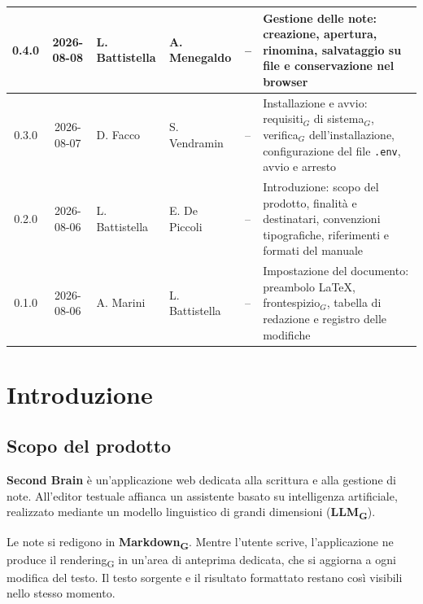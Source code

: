 \documentclass[a4paper, 10pt]{article}
\begin{document}
\begin{longtable}{|c|c|P{2.1cm}|P{2.1cm}|P{2.1cm}|P{3.1cm}|}
    0.4.0 & 2026-08-08 & L. Battistella & A. Menegaldo & -- & Gestione delle note: creazione, apertura, rinomina, salvataggio su file e conservazione nel browser \\ \hline

    0.3.0 & 2026-08-07 & D. Facco & S. Vendramin & -- & Installazione e avvio: requisiti$_G$ di sistema$_G$, verifica$_G$ dell'installazione, configurazione del file \texttt{.env}, avvio e arresto \\ \hline

    0.2.0 & 2026-08-06 & L. Battistella & E. De Piccoli & -- & Introduzione: scopo del prodotto, finalità e destinatari, convenzioni tipografiche, riferimenti e formati del manuale \\ \hline

    0.1.0 & 2026-08-06 & A. Marini & L. Battistella & -- & Impostazione del documento: preambolo \LaTeX{}, frontespizio$_G$, tabella di redazione e registro delle modifiche \\ \hline

\end{longtable}
\addtocounter{table}{-1}
\endgroup

\newpage
\tableofcontents
\newpage

\listoftables
\newpage

\listoffigures
\newpage


\section{Introduzione}
\label{sec:introduzione}

\subsection{Scopo del prodotto}
\label{sec:scopo-prodotto}
\textbf{Second Brain} è un'applicazione web dedicata alla scrittura e alla gestione di note. All'editor testuale affianca un assistente basato su intelligenza artificiale, realizzato mediante un modello linguistico di grandi dimensioni (\textbf{LLM\textsubscript{G}}).

Le note si redigono in \textbf{Markdown\textsubscript{G}}. Mentre l'utente scrive, l'applicazione ne produce il rendering\textsubscript{G} in un'area di anteprima dedicata, che si aggiorna a ogni modifica del testo. Il testo sorgente e il risultato formattato restano così visibili nello stesso momento.
\end{document}
